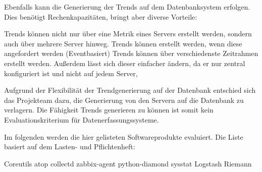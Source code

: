 Ebenfalls kann die Generierung der Trends auf dem Datenbanksystem erfolgen.
Dies benötigt Rechenkapazitäten, bringt aber diverse Vorteile:

\begin{outline}
  \1 Trends können nicht nur über eine Metrik eines Servers erstellt werden,
  sondern auch über mehrere Server hinweg.
  \1 Trends können erstellt werden, wenn diese angefordert werden
  (Eventbasiert)
  \1 Trends können über verschiedenste Zeitrahmen erstellt werden. Außerdem
  lässt sich dieser einfacher ändern, da er nur zentral konfiguriert ist und
  nicht auf jedem Server,
\end{outline}

Aufgrund der Flexibilität der Trendgenerierung auf der Datenbank entschied sich
das Projekteam dazu, die Generierung von den Servern auf die Datenbank zu
verlagern. Die Fähigkeit Trends generieren zu können ist somit kein
Evaluationskriterium für Datenerfassungssysteme.

Im folgenden werden die hier gelisteten Softwareprodukte evaluiert. Die Liste
basiert auf dem Lasten- und Pflichtenheft:

\begin{outline}
  \1 Coreutils
  \1 atop
  \1 collectd
  \1 zabbix-agent
  \1 python-diamond
  \1 sysstat
  \1 Logstash
  \1 Riemann
\end{outline}
\tm%

